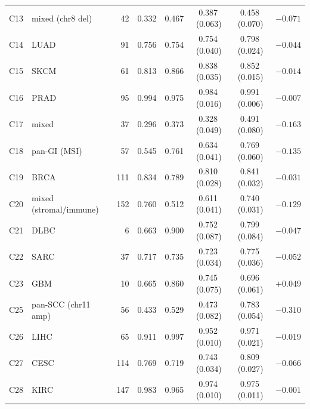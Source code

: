 \documentclass[10pt]{article}
\begin{document}
\begin{table}[h]
\begin{tabular}{llr ccc c c}
C13 & mixed (chr8 del) & 42 & 0.332 & 0.467 & 0.387\,(0.063) & 0.458\,(0.070) & $-0.071$ \\
C14 & LUAD & 91 & 0.756 & 0.754 & 0.754\,(0.040) & 0.798\,(0.024) & $-0.044$ \\
C15 & SKCM & 61 & 0.813 & 0.866 & 0.838\,(0.035) & 0.852\,(0.015) & $-0.014$ \\
C16 & PRAD & 95 & 0.994 & 0.975 & 0.984\,(0.016) & 0.991\,(0.006) & $-0.007$ \\
C17 & mixed & 37 & 0.296 & 0.373 & 0.328\,(0.049) & 0.491\,(0.080) & $-0.163$ \\
C18 & pan-GI (MSI) & 57 & 0.545 & 0.761 & 0.634\,(0.041) & 0.769\,(0.060) & $-0.135$ \\
C19 & BRCA & 111 & 0.834 & 0.789 & 0.810\,(0.028) & 0.841\,(0.032) & $-0.031$ \\
C20 & mixed (stromal/immune) & 152 & 0.760 & 0.512 & 0.611\,(0.041) & 0.740\,(0.031) & $-0.129$ \\
C21 & DLBC & 6 & 0.663 & 0.900 & 0.752\,(0.087) & 0.799\,(0.084) & $-0.047$ \\
C22 & SARC & 37 & 0.717 & 0.735 & 0.723\,(0.034) & 0.775\,(0.036) & $-0.052$ \\
C23 & GBM & 10 & 0.665 & 0.860 & 0.745\,(0.075) & 0.696\,(0.061) & $+0.049$ \\
C25 & pan-SCC (chr11 amp) & 56 & 0.433 & 0.529 & 0.473\,(0.082) & 0.783\,(0.054) & $-0.310$ \\
C26 & LIHC & 65 & 0.911 & 0.997 & 0.952\,(0.010) & 0.971\,(0.021) & $-0.019$ \\
C27 & CESC & 114 & 0.769 & 0.719 & 0.743\,(0.034) & 0.809\,(0.027) & $-0.066$ \\
C28 & KIRC & 147 & 0.983 & 0.965 & 0.974\,(0.010) & 0.975\,(0.011) & $-0.001$ \\
\bottomrule
\end{tabular}
\end{table}
\end{document}
